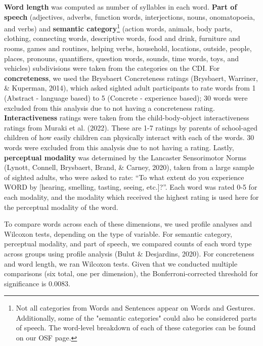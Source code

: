 \documentclass[
  man,floatsintext]{apa6}
\begin{document}
\textbf{Word length} was computed as number of syllables in each word. \textbf{Part of speech} (adjectives, adverbs, function words, interjections, nouns, onomatopoeia, and verbs) and \textbf{semantic category}\footnote{Not all categories from Words and Sentences appear on Words and Gestures. Additionally, some of the "semantic categories" could also be considered parts of speech. The word-level breakdown of each of these categories can be found on our OSF page.} (action words, animals, body parts, clothing, connecting words, descriptive words, food and drink, furniture and rooms, games and routines, helping verbs, household, locations, outside, people, places, pronouns, quantifiers, question words, sounds, time words, toys, and vehicles) subdivisions were taken from the categories on the CDI. For \textbf{concreteness}, we used the Brysbaert Concreteness ratings (Brysbaert, Warriner, \& Kuperman, 2014), which asked sighted adult participants to rate words from 1 (Abstract - language based) to 5 (Concrete - experience based); 30 words were excluded from this analysis due to not having a concreteness rating. \textbf{Interactiveness} ratings were taken from the child-body-object interactiveness ratings from Muraki et al. (2022). These are 1-7 ratings by parents of school-aged children of how easily children can physically interact with each of the words. 30 words were excluded from this analysis due to not having a rating. Lastly, \textbf{perceptual modality} was determined by the Lancaster Sensorimotor Norms (Lynott, Connell, Brysbaert, Brand, \& Carney, 2020), taken from a large sample of sighted adults, who were asked to rate: ``To what extent do you experience WORD by {[}hearing, smelling, tasting, seeing, etc.{]}?''. Each word was rated 0-5 for each modality, and the modality which received the highest rating is used here for the perceptual modality of the word.

To compare words across each of these dimensions, we used profile analyses and Wilcoxon tests, depending on the type of variable. For semantic category, perceptual modality, and part of speech, we compared counts of each word type across groups using profile analysis (Bulut \& Desjardins, 2020). For concreteness and word length, we ran Wilcoxon tests. Given that we conducted multiple comparisons (six total, one per dimension), the Bonferroni-corrected threshold for significance is 0.0083.
\end{document}
